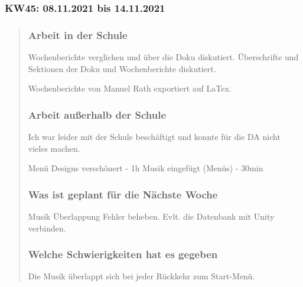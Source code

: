 
\subsubsection{KW45: 08.11.2021 bis 14.11.2021}
\begin{quote}
	\subsubsection*{Arbeit in der Schule}
	Wochenberichte verglichen und über die Doku diskutiert.
	Überschrifte und Sektionen der Doku und Wochenberichte diskutiert.	
	
	Wochenberichte von Manuel Rath exportiert auf LaTex.
	
	\subsubsection*{Arbeit außerhalb der Schule}
	Ich war leider mit der Schule beschäftigt und konnte für die DA nicht vieles machen.
	
	Menü Designs verschönert - 1h
	Musik eingefügt (Menüs) - 30min
	
	
	\subsubsection*{Was ist geplant für die Nächste Woche}
	Musik Überlappung Fehler beheben. Evlt. die Datenbank mit Unity verbinden.
	
	\subsubsection*{Welche Schwierigkeiten hat es gegeben}
	Die Musik überlappt sich bei jeder Rückkehr zum Start-Menü.
	
\end{quote}
